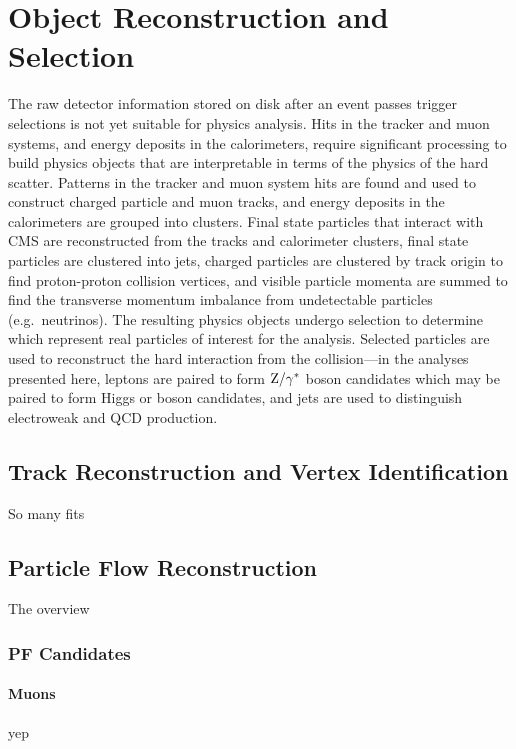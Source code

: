 \chapter{Object Reconstruction and Selection}

The raw detector information stored on disk after an event passes trigger selections is not yet suitable for physics analysis.
Hits in the tracker and muon systems, and energy deposits in the calorimeters, require significant processing to build physics objects that are interpretable in terms of the physics of the hard scatter.
Patterns in the tracker and muon system hits are found and used to construct charged particle and muon tracks, and energy deposits in the calorimeters are grouped into clusters.
Final state particles that interact with CMS are reconstructed from the tracks and calorimeter clusters, final state particles are clustered into jets, charged particles are clustered by track origin to find proton-proton collision vertices, and visible particle momenta are summed to find the transverse momentum imbalance from undetectable particles (e.g.\ neutrinos).
The resulting physics objects undergo selection to determine which represent real particles of interest for the analysis.
Selected particles are used to reconstruct the hard interaction from the collision---in the analyses presented here, leptons are paired to form $\mathrm{Z}/\mathrm{\gamma}^\ast$ boson candidates which may be paired to form Higgs or {\PZ} boson candidates, and jets are used to distinguish electroweak and QCD {\ZZ} production.


\section{Track Reconstruction and Vertex Identification}
So many fits



\section{Particle Flow Reconstruction}
The overview

\subsection{PF Candidates}

\subsubsection{Muons}
yep

